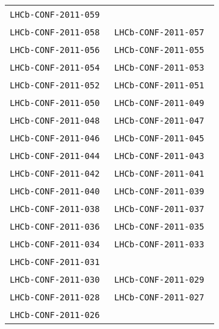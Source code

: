 \begin{center}
\begin{longtable}{ll}
\texttt{LHCb-CONF-2011-059}~\cite{LHCb-CONF-2011-059} \\
\texttt{LHCb-CONF-2011-058}~\cite{LHCb-CONF-2011-058} & 
\texttt{LHCb-CONF-2011-057}~\cite{LHCb-CONF-2011-057} \\
\texttt{LHCb-CONF-2011-056}~\cite{LHCb-CONF-2011-056} & 
\texttt{LHCb-CONF-2011-055}~\cite{LHCb-CONF-2011-055} \\ 
\texttt{LHCb-CONF-2011-054}~\cite{LHCb-CONF-2011-054} &
\texttt{LHCb-CONF-2011-053}~\cite{LHCb-CONF-2011-053} \\ 
\texttt{LHCb-CONF-2011-052}~\cite{LHCb-CONF-2011-052} &
\texttt{LHCb-CONF-2011-051}~\cite{LHCb-CONF-2011-051} \\ 
\texttt{LHCb-CONF-2011-050}~\cite{LHCb-CONF-2011-050} &
\texttt{LHCb-CONF-2011-049}~\cite{LHCb-CONF-2011-049} \\
\texttt{LHCb-CONF-2011-048}~\cite{LHCb-CONF-2011-048} & 
\texttt{LHCb-CONF-2011-047}~\cite{LHCb-CONF-2011-047} \\
\texttt{LHCb-CONF-2011-046}~\cite{LHCb-CONF-2011-046} & 
\texttt{LHCb-CONF-2011-045}~\cite{LHCb-CONF-2011-045} \\ 
\texttt{LHCb-CONF-2011-044}~\cite{LHCb-CONF-2011-044} &
\texttt{LHCb-CONF-2011-043}~\cite{LHCb-CONF-2011-043} \\ 
\texttt{LHCb-CONF-2011-042}~\cite{LHCb-CONF-2011-042} &
\texttt{LHCb-CONF-2011-041}~\cite{LHCb-CONF-2011-041} \\ 
\texttt{LHCb-CONF-2011-040}~\cite{LHCb-CONF-2011-040} &
\texttt{LHCb-CONF-2011-039}~\cite{LHCb-CONF-2011-039} \\
\texttt{LHCb-CONF-2011-038}~\cite{LHCb-CONF-2011-038} &
\texttt{LHCb-CONF-2011-037}~\cite{LHCb-CONF-2011-037} \\
\texttt{LHCb-CONF-2011-036}~\cite{LHCb-CONF-2011-036} &
\texttt{LHCb-CONF-2011-035}~\cite{LHCb-CONF-2011-035} \\
\texttt{LHCb-CONF-2011-034}~\cite{LHCb-CONF-2011-034} &
\texttt{LHCb-CONF-2011-033}~\cite{LHCb-CONF-2011-033} \\
\texttt{LHCb-CONF-2011-031}~\cite{LHCb-CONF-2011-031} \\
\texttt{LHCb-CONF-2011-030}~\cite{LHCb-CONF-2011-030} &
\texttt{LHCb-CONF-2011-029}~\cite{LHCb-CONF-2011-029} \\
\texttt{LHCb-CONF-2011-028}~\cite{LHCb-CONF-2011-028} &
\texttt{LHCb-CONF-2011-027}~\cite{LHCb-CONF-2011-027} \\
\texttt{LHCb-CONF-2011-026}~\cite{LHCb-CONF-2011-026} &

\end{longtable}
\end{center}
